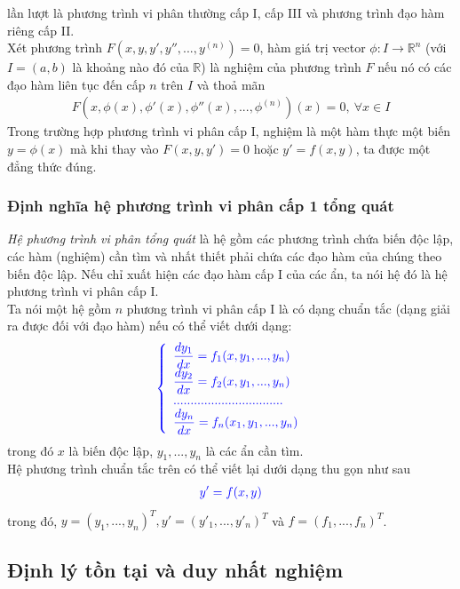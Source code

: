 \documentclass[13pt,a4paper]{article}
\begin{document}
				lần lượt là phương trình vi phân thường cấp I, cấp III và phương trình đạo hàm riêng cấp II.
\\
				Xét phương trình $F(x, y, y', y'',..., y^{(n)}) = 0$, hàm giá trị vector $\phi : I \rightarrow \mathbb{R}^n$ (với $I = (a, b)$ là khoảng nào đó của $\mathbb{R}$) là nghiệm của phương trình $F$ nếu nó có các đạo hàm liên tục đến cấp $n$ trên $I$ và thoả mãn 
				\begin{align*}
					F(x, \phi(x), \phi'(x), \phi''(x),...,\phi^{(n)})(x) = 0,\ \forall x \in I
				\end{align*}
				Trong trường hợp phương trình vi phân cấp I, nghiệm là một hàm thực một biến $y = \phi(x)$ mà khi thay vào $F(x, y, y') = 0$ hoặc $y' =f(x,y)$, ta được một đẳng thức đúng.
			\subsubsection{Định nghĩa hệ phương trình vi phân cấp 1 tổng quát}
				\textit{Hệ phương trình vi phân tổng quát} là hệ gồm các phương trình chứa biến độc lập, các hàm (nghiệm) cần tìm và nhất thiết phải chứa các đạo hàm của chúng theo biến độc lập. Nếu chỉ xuất hiện các đạo hàm cấp I của các ẩn, ta nói hệ đó là hệ phương trình vi phân cấp I.
\\
				Ta nói một hệ gồm $n$ phương trình vi phân cấp I là có dạng chuẩn tắc (dạng giải ra được đối với đạo hàm) nếu có thể viết dưới dạng: 
				\begin{align*}
					\color{blue}
						\left\{\begin{array}{l}
							\dfrac{dy_1}{dx} = f_1(x, y_1,..., y_n) \\
							\dfrac{dy_2}{dx} = f_2(x, y_1,..., y_n) \\
							................................ \\
							\dfrac{dy_n}{dx} = f_n(x_1, y_1,..., y_n)
						\end{array}\right.
					\color{blue}
				\end{align*}
				trong đó $x$ là biến độc lập, $y_1,..., y_n$ là các ẩn cần tìm.\\
				Hệ phương trình chuẩn tắc trên có thể viết lại dưới dạng thu gọn như sau
				\begin{align*}
					\color{blue}
						y' = f(x,y)
					\color{blue}
				\end{align*}
				trong đó, $y = (y_1,...,y_n)^T, y' = (y'_1,...,y'_n)^T$ và $f = (f_1,...,f_n)^T$. \\
		\subsection{Định lý tồn tại và duy nhất nghiệm}
\end{document}
